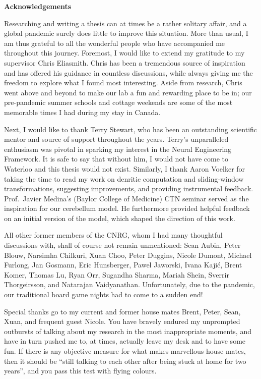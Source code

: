 \begin{center}\textbf{Acknowledgements}\end{center}

Researching and writing a thesis can at times be a rather solitary affair, and a global pandemic surely does little to improve this situation.
More than usual, I am thus grateful to all the wonderful people who have accompanied me throughout this journey.
Foremost, I would like to extend my gratitude to my supervisor Chris Eliasmith.
Chris has been a tremendous source of inspiration and has offered his guidance in countless discussions, while always giving me the freedom to explore what I found most interesting.
Aside from research, Chris went above and beyond to make our lab a fun and rewarding place to be in; our pre-pandemic summer schools and cottage weekends are some of the most memorable times I had during my stay in Canada.

Next, I would like to thank Terry Stewart, who has been an outstanding scientific mentor and source of support throughout the years.
Terry's unparalleled enthusiasm was pivotal in sparking my interest in the Neural Engineering Framework.
It is safe to say that without him, I would not have come to Waterloo and this thesis would not exist.
Similarly, I thank Aaron Voelker for taking the time to read my work on denritic computation and sliding-window transformations, suggesting improvements, and providing instrumental feedback.
Prof.~Javier Medina's (Baylor College of Medicine) CTN seminar served as the inspiration for our cerebellum model.
He furthermore provided helpful feedback on an initial version of the model, which shaped the direction of this work.

All other former members of the CNRG, whom I had many thoughtful discussions with, shall of course not remain unmentioned: Sean Aubin, Peter Blouw, Narsimha Chilkuri, Xuan Choo, Peter Duggins, Nicole Dumont, Michael Furlong, Jan Gosmann, Eric Hunsberger, Pawel Jaworski, Ivana Kajić, Brent Komer, Thomas Lu, Ryan Orr, Sugandha Sharma, Mariah Shein, Sverrir Thorgeirsson, and Natarajan Vaidyanathan.
Unfortunately, due to the pandemic, our traditional board game nights had to come to a sudden end!

Special thanks go to my current and former house mates Brent, Peter, Sean, Xuan, and frequent guest Nicole.
You have bravely endured my unprompted outbursts of talking about my research in the most inappropriate moments, and have in turn pushed me to, at times, actually leave my desk and to have some fun.
If there is any objective measure for what makes marvellous house mates, then it should be \enquote{still talking to each other after being stuck at home for two years}, and you pass this test with flying colours.

